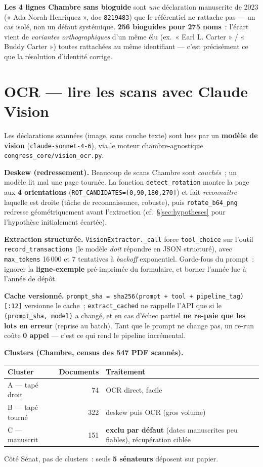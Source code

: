 \documentclass[11pt,a4paper]{article}
\newcommand{\co}[1]{\texttt{\small #1}}
\begin{document}
\textbf{Les 4 lignes Chambre sans bioguide} sont \emph{une} déclaration manuscrite de 2023 (« Ada Norah
Henriquez », doc \co{8219483}) que le référentiel ne rattache pas — un cas isolé, non un défaut
systémique. \textbf{256 bioguides pour 275 noms}~: l'écart vient de \emph{variantes orthographiques}
d'un même élu (ex.~« Earl L. Carter » / « Buddy Carter ») toutes rattachées au même identifiant — c'est
précisément ce que la résolution d'identité corrige.

\section{OCR — lire les scans avec Claude Vision}
\label{sec:ocr}

Les déclarations scannées (image, sans couche texte) sont lues par un \textbf{modèle de vision}
(\co{claude-sonnet-4-6}), via le moteur chambre-agnostique \co{congress_core/vision_ocr.py}.

\textbf{Deskew (redressement).} Beaucoup de scans Chambre sont \emph{couchés}~; un modèle lit mal une
page tournée. La fonction \co{detect_rotation} montre la page aux \textbf{4 orientations}
(\co{ROT_CANDIDATES=[0,90,180,270]}) et fait \emph{reconnaître} laquelle est droite (tâche de
reconnaissance, robuste), puis \co{rotate_b64_png} redresse géométriquement avant l'extraction
(cf.~§\ref{sec:hypotheses} pour l'hypothèse initialement écartée).

\textbf{Extraction structurée.} \co{VisionExtractor._call} force \co{tool_choice} sur l'outil
\co{record_transactions} (le modèle \emph{doit} répondre en JSON structuré), avec \co{max_tokens}
16\,000 et 7 tentatives à \emph{backoff} exponentiel. Garde-fous du prompt~: ignorer la
\textbf{ligne-exemple} pré-imprimée du formulaire, et borner l'année lue à l'année de dépôt.

\textbf{Cache versionné.} \co{prompt_sha = sha256(prompt + tool + pipeline_tag)[:12]} versionne le
cache~; \co{extract_cached} ne rappelle l'API que si le \co{(prompt_sha, model)} a changé, et en cas
d'échec partiel \textbf{ne re-paie que les lots en erreur} (reprise au batch). Tant que le prompt ne
change pas, un re-run coûte \textbf{0 appel} — c'est ce qui rend le pipeline incrémental.

\textbf{Clusters (Chambre, census des 547 PDF scannés).}
\begin{center}\small
\begin{tabular}{lrl}
\toprule
\bfseries Cluster & \bfseries Documents & \bfseries Traitement\\
\midrule
A — tapé droit & 74 & OCR direct, facile \\
B — tapé tourné & 322 & deskew puis OCR (gros volume) \\
C — manuscrit & 151 & \textbf{exclu par défaut} (dates manuscrites peu fiables), récupération ciblée \\
\bottomrule
\end{tabular}
\end{center}
Côté Sénat, pas de clusters~: seuls \textbf{5 sénateurs} déposent sur papier.
\end{document}
